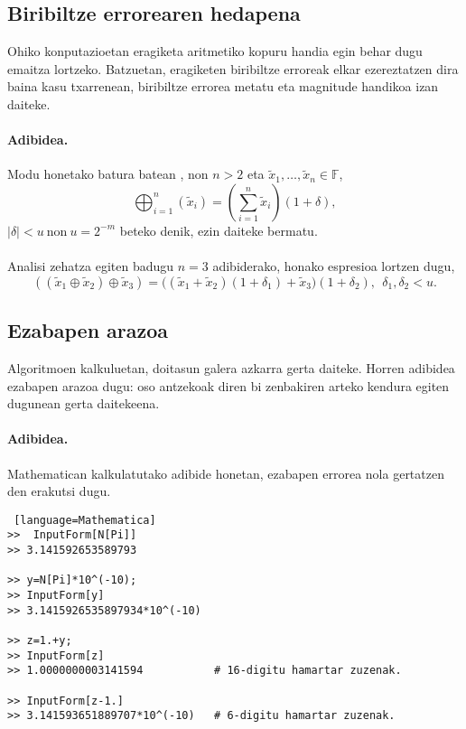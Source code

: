 \subsection*{Biribiltze errorearen hedapena}


Ohiko konputazioetan eragiketa aritmetiko kopuru handia egin behar dugu emaitza lortzeko. Batzuetan, eragiketen biribiltze erroreak elkar ezereztatzen dira baina kasu txarrenean, biribiltze errorea metatu eta magnitude handikoa izan daiteke.   

\paragraph*{Adibidea.} 
Modu honetako batura batean , non $n>2$ eta $\tilde x_1,\dots,\tilde x_n \in \mathbb{F}$,  
\begin{equation*}
\bigoplus_{i=1}^{n}(\tilde x_i)=(\sum\limits_{i=1}^{n} \tilde x_i)(1+\delta),
\end{equation*}
$|\delta|<u \ \text{non} \  u=2^{-m}$ beteko denik, ezin daiteke bermatu. 

\paragraph*{}Analisi zehatza egiten badugu $n=3$ adibiderako, honako espresioa lortzen dugu,
\begin{equation*}
((\tilde x_1 \oplus \tilde x_2) \oplus \tilde x_3)  = 
  \big((\tilde x_1 + \tilde x_2)(1+\delta_1)
  +\tilde x_3 \big) (1+\delta_2), \ \ \delta_1,\delta_2<u.
\end{equation*}

\subsection*{Ezabapen arazoa}

Algoritmoen kalkuluetan, doitasun galera azkarra gerta daiteke. Horren adibidea ezabapen arazoa dugu: oso antzekoak diren bi zenbakiren arteko kendura egiten dugunean gerta daitekeena. 

\paragraph*{Adibidea.} Mathematican kalkulatutako adibide honetan, ezabapen errorea nola gertatzen den erakutsi dugu. 
\begin{lstlisting} [language=Mathematica]
>>  InputForm[N[Pi]]
>> 3.141592653589793

>> y=N[Pi]*10^(-10);
>> InputForm[y]
>> 3.1415926535897934*10^(-10)

>> z=1.+y;
>> InputForm[z]
>> 1.0000000003141594           # 16-digitu hamartar zuzenak.

>> InputForm[z-1.]
>> 3.141593651889707*10^(-10)   # 6-digitu hamartar zuzenak.

\end{lstlisting}


